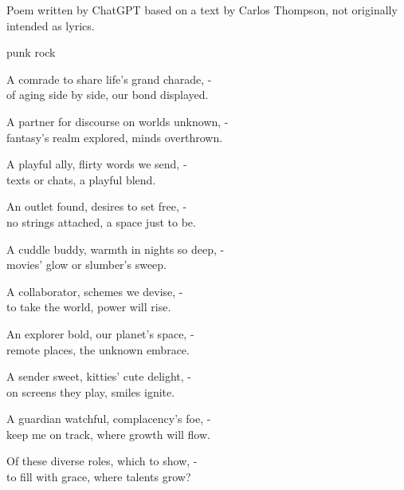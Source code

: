 

\begin{notes}
Poem written by ChatGPT based on a text by Carlos Thompson, not originally intended as lyrics.
\end{notes}

\begin{style}
punk rock
\end{style}

\begin{lyrics}
A comrade to share life's grand charade, -\\
of aging side by side, our bond displayed.

A partner for discourse on worlds unknown, -\\
fantasy's realm explored, minds overthrown.

A playful ally, flirty words we send, -\\
texts or chats, a playful blend.

An outlet found, desires to set free, -\\
no strings attached, a space just to be.

A cuddle buddy, warmth in nights so deep, -\\
movies' glow or slumber's sweep.

A collaborator, schemes we devise, -\\
to take the world, power will rise.

An explorer bold, our planet's space, -\\
remote places, the unknown embrace.

A sender sweet, kitties' cute delight, -\\
on screens they play, smiles ignite.

A guardian watchful, complacency's foe, -\\
keep me on track, where growth will flow.

Of these diverse roles, which to show, -\\
to fill with grace, where talents grow?

\end{lyrics}

